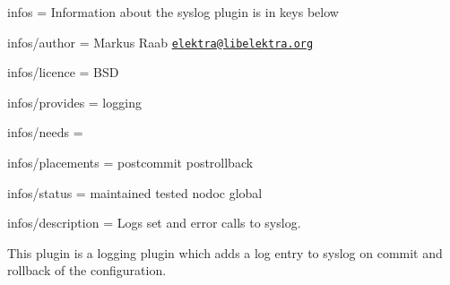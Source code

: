 
\begin{DoxyItemize}
\item infos = Information about the syslog plugin is in keys below
\item infos/author = Markus Raab \href{mailto:elektra@libelektra.org}{\tt elektra@libelektra.\+org}
\item infos/licence = B\+S\+D
\item infos/provides = logging
\item infos/needs =
\item infos/placements = postcommit postrollback
\item infos/status = maintained tested nodoc global
\item infos/description = Logs set and error calls to syslog.
\end{DoxyItemize}

This plugin is a logging plugin which adds a log entry to syslog on commit and rollback of the configuration. 
